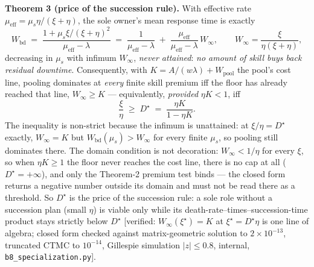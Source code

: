 \documentclass[11pt,a4paper]{article}
\begin{document}
\begin{thebox}
\textbf{Theorem 3 (price of the succession rule).} With effective rate $\mu_{\mathrm{eff}}=\mu_s\eta/(\xi+\eta)$, the sole
owner's mean response time is exactly
\[ W_{\mathrm{bd}} \;=\; \frac{1+\mu_s\xi/(\xi+\eta)^2}{\mu_{\mathrm{eff}}-\lambda}
\;=\; \frac{1}{\mu_{\mathrm{eff}}-\lambda} \;+\; \frac{\mu_{\mathrm{eff}}}{\mu_{\mathrm{eff}}-\lambda}\,W_\infty,
\qquad W_\infty=\frac{\xi}{\eta(\xi+\eta)}, \]
decreasing in $\mu_s$ with infimum $W_\infty$, \emph{never attained}: \emph{no amount of skill buys back residual downtime}.
Consequently, with $K = A/(w\lambda) + W_{\mathrm{pool}}$ the pool's cost line, pooling dominates at \emph{every} finite skill
premium iff the floor has already reached that line, $W_\infty \ge K$ --- equivalently, \emph{provided} $\eta K < 1$, iff
\[ \frac{\xi}{\eta} \;\ge\; D^\star \;=\; \frac{\eta K}{1-\eta K}. \]
The inequality is non-strict because the infimum is unattained: at $\xi/\eta = D^\star$ exactly, $W_\infty = K$ but
$W_{\mathrm{bd}}(\mu_s) > W_\infty$ for every finite $\mu_s$, so pooling still dominates there. The domain condition is not
decoration: $W_\infty < 1/\eta$ for every $\xi$, so when $\eta K \ge 1$ the floor never reaches the cost line, there is no cap at
all ($D^\star = +\infty$), and only the Theorem-2 premium test binds --- the closed form returns a negative number outside its
domain and must not be read there as a threshold. So $D^\star$ is the price of the succession rule: a sole role without a
succession plan (small $\eta$) is viable only while its
death-rate--times--succession-time product stays strictly below $D^\star$ [verified: $W_\infty(\xi^\star)=K$ at
$\xi^\star=D^\star\eta$ is one line of algebra; closed form checked against matrix-geometric solution to $2\times10^{-13}$,
truncated CTMC to $10^{-14}$, Gillespie simulation $|z|\le0.8$, internal, \texttt{b8\_specialization.py}].
\end{thebox}
\end{document}
